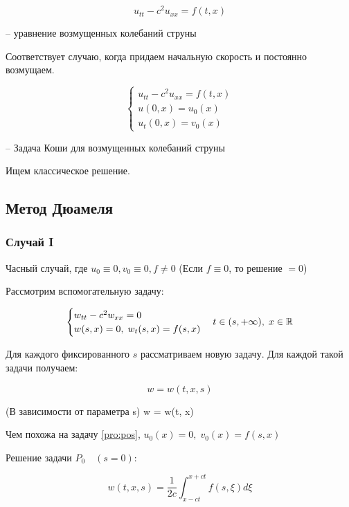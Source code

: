 \documentclass[12pt]{report}
\begin{document}
\begin{equation} \label{eq:oscstr}
    u_{tt} - c ^ 2 u_{xx} = f(t, x)
\end{equation}

-- уравнение возмущенных колебаний струны 

Соответствует случаю, когда придаем начальную скорость и постоянно возмущаем. 

\begin{equation} \label{pro:pos}
    \begin{cases}
        u_{tt} - c ^ 2 u_{xx} = f(t, x)
        \\
        u(0, x) = u_0(x)
        \\
        u_t(0, x) = v_0(x)
    \end{cases}
\end{equation}

-- Задача Коши для возмущенных колебаний струны

Ищем классическое решение. 

\subsection{Метод Дюамеля}

\subsubsection{Случай I}
Часный случай, где $u_0 \equiv 0, v_0 \equiv 0, f \ne 0$ (Если $f \equiv 0$, то решение $= 0$)

Рассмотрим вспомогательную задачу:

\[
    \begin{cases}
        w_{tt} - c ^ 2 w_{xx} = 0
        \\
        w(s, x) = 0, \; w_t(s, x) = f(s, x)
    \end{cases}
    \\
    t \in (s, + \infty), \; x \in \mathbb{R} 
\]

Для каждого фиксированного $s$ рассматриваем новую задачу. Для каждой такой задачи получаем: 

$$w = w(t, x, s)$$

(В зависимости от параметра s) w = w(t, x)

Чем похожа на задачу \eqref{pro:pos}, $u_0(x) = 0, \; v_0(x) = f(s, x)$

Решение задачи $P_0 \quad (s = 0)$: 

\[
    w(t, x, s) = \frac{1}{2c} \int^{x + ct}_{x - ct}{f(s, \xi) d \xi}
\]
\end{document}
